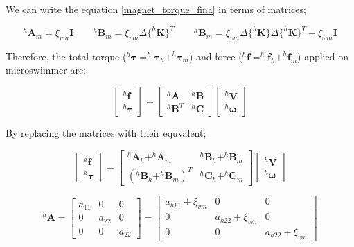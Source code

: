 \documentclass[12pt,a4paper,titlepage]{report}
\begin{document}
We can write the equation \ref{magnet_torque_fina} in terms of matrices;


\begin{equation}
^{h}\bm{A}_m = \xi_{vm} \bm{I}  \qquad  ^{h}\bm{B}_m = \xi_{vm} \Delta \{ ^{h}\bm{K} \}^T \qquad
{^{h}\bm{B}_m = \xi_{vm} \Delta \{ ^{h}\bm{K} \} \Delta \{ ^{h}\bm{K} \}^T} + \xi_{\omega m} \bm{ I}
\label{A_m}
\end{equation}

Therefore, the total torque ($^{h}\bm{\tau} =^{h}\bm{\tau}_h +^{h}\bm{\tau}_m$) and force
 ($^{h}\bm{f} =^{h}\bm{f}_h +^{h}\bm{f}_m$) applied on microswimmer are:


\[
\begin{bmatrix} ^{h}\bm{f}\\ 
^{h}\bm{\tau}\end{bmatrix}  = \begin{bmatrix} ^{h}\bm{A} & ^{h}\bm{B}\\ 
^{h}\bm{B}^{T} & ^{h}\bm{C} \end{bmatrix}  \begin{bmatrix} ^{h}\bm{V}
 \\ ^{h}\bm{\omega}
\end{bmatrix}
\]

By replacing the matrices with their equvalent;

\[
\begin{bmatrix} ^{h}\bm{f}\\ 
^{h}\bm{\tau}\end{bmatrix}  = \begin{bmatrix} ^{h}\bm{A}_{h} + ^{h}\bm{A}_{m} & {^{h}\bm{B}_{h} + ^{h}\bm{B}_{m} }\\ 
({^{h}\bm{B}_{h} + ^{h}\bm{B}_{m} })^{T} & ^{h}\bm{C}_{h} + ^{h}\bm{C}_{m} \end{bmatrix}  \begin{bmatrix} ^{h}\bm{V}
 \\ ^{h}\bm{\omega}
\end{bmatrix}
\]



\begin{equation}
 ^{h}\bm{A} = \begin{bmatrix}
       a_{11}  & 0 		 & 0           \\[0.3em]
       0		 & a_{22}           & 0\\[0.3em]
       0           	& 0 		& a_{22}
     \end{bmatrix}
	=
	 \begin{bmatrix}
       a_{h11}+\xi_{vm}  & 0 		 & 0           \\[0.3em]
       0		 & a_{h22}+\xi_{vm}           & 0\\[0.3em]
       0           	& 0 		& a_{h22}+\xi_{vm}
     \end{bmatrix}
\label{A_finalmatrix}
\end{equation}
\end{document}

